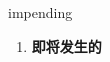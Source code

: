 
\begin{frame}
{\huge impending}
\begin{center}
\begin{enumerate}\Large
  \item \textbf{即将发生的}
\end{enumerate}
\end{center}
\end{frame}
